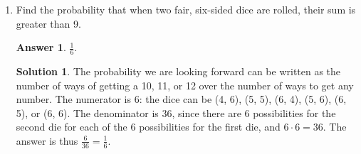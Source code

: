\documentclass[11pt]{article}
\theoremstyle{definition}
\newtheorem*{solution}{Solution}
\newtheorem*{answer}{Answer}
\begin{document}
\begin{enumerate}
\item Find the probability that when two fair, six-sided dice are rolled, their sum is greater than 9.

\begin{answer}
$\frac{1}{6}$.
\end{answer}
\begin{solution} The probability we are looking forward can be written as the number of ways of getting a 10, 11, or 12 over the number of ways to get any number. The numerator is 6: the dice can be (4, 6), (5, 5), (6, 4), (5, 6), (6, 5), or (6, 6). The denominator is 36, since there are 6 possibilities for the second die for each of the 6 possibilities for the first die, and $6 \cdot 6 = 36$. The answer is thus $\displaystyle \frac{6}{36} = \boxed{\frac{1}{6}}$.
\end{solution}

\end{enumerate}
\end{document}

